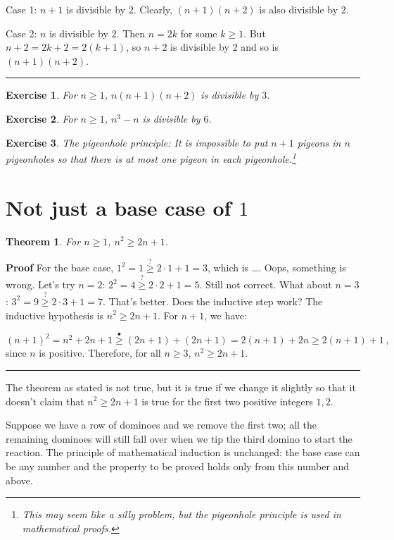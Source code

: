 \documentclass[11pt,a4paper]{report}
\newcommand*{\ihge}{\stackrel{\bullet}{\geq}}
\newcommand*{\qge}{\stackrel{?}{\geq}}
\newcommand*{\qed}{\hfill\rule{1ex}{1.5ex}}
\newtheorem{theorem}{Theorem}
\newtheorem{exercise}{Exercise}
\begin{document}
Case 1: $n+1$ is divisible by $2$. Clearly, $(n+1)(n+2)$ is also divisible by $2$.

Case 2: $n$ is divisible by $2$. Then $n=2k$ for some $k\geq 1$. But $n+2 = 2k+2 = 2(k+1)$, so $n+2$ is divisible by $2$ and so is $(n+1)(n+2)$.\qed

\begin{exercise}\label{e.div3}
For $n\geq 1$, $n(n+1)(n+2)$ is divisible by $3$.
\end{exercise}

\begin{exercise}\label{e.div6}
For $n\geq 1$, $n^3-n$ is divisible by $6$.
\end{exercise}

\begin{exercise}
The pigeonhole principle: It is impossible to put $n+1$ pigeons in $n$ pigeonholes so that there is at most one pigeon in each pigeonhole.\footnote{This may seem like a silly problem, but the pigeonhole principle is used in mathematical proofs.}
\end{exercise}

\section{Not just a base case of $1$}

\begin{theorem} For $n\geq 1$, $n^2\geq 2n+1$.
\end{theorem}

\textbf{Proof} For the base case, $1^2 = 1 \qge 2\cdot 1+1 = 3$, which is \ldots. Oops, something is wrong. Let's try $n=2$: $2^2 = 4 \qge 2\cdot 2+1 = 5$. Still not correct. What about $n=3$: $3^2 = 9 \qge 2\cdot 3+1 = 7$. That's better. Does the inductive step work? The inductive hypothesis is $n^2 \geq 2n+1$. For $n+1$, we have:

\[
(n+1)^2 = n^2 + 2n + 1 \ihge{}
(2n+1)+(2n+1) = 2(n+1) + 2n \geq 2(n+1)+1\,,
\]
since $n$ is positive. Therefore, for all $n\geq 3$, $n^2\geq 2n+1$.\qed

The theorem as stated is not true, but it is true if we change it slightly so that it doesn't claim that $n^2\geq 2n+1$ is true for the first two positive integers $1,2$.

Suppose we have a row of dominoes and we remove the first two; all the remaining dominoes will still fall over when we tip the third domino to start the reaction. The principle of mathematical induction is unchanged: the base case can be any number and the property to be proved holds only from this number and above.
\end{document}
